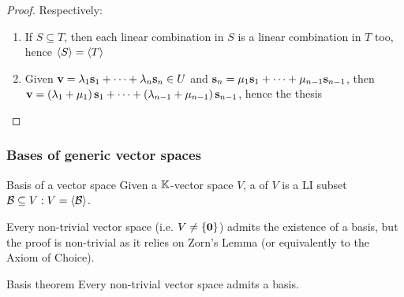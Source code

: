 \begin{proofbox}
  \begin{proof}
    Respectively:
    \begin{enumerate}[label = {\alph*.}]
      \item If $ S \subseteq T $, then each linear combination in $ S $ is a linear combination in $ T $ too, hence $ \braket{S} = \braket{T} $
      \item Given $ \mathbf{v} = \lambda_1 \mathbf{s}_1 + \dots + \lambda_n \mathbf{s}_n \in U $ and $ \mathbf{s}_n = \mu_1 \mathbf{s}_1 + \dots + \mu_{n-1} \mathbf{s}_{n-1} $, then $ \mathbf{v} = \left( \lambda_1 + \mu_1 \right) \mathbf{s}_1 + \dots + \left( \lambda_{n-1} + \mu_{n-1} \right) \mathbf{s}_{n-1} $, hence the thesis
    \end{enumerate}
  \end{proof}
\end{proofbox}

\subsubsection{Bases of generic vector spaces}

\begin{definition}{Basis of a vector space}{}
  Given a $ \mathbb{K} $-vector space $ V $, a  of $ V $ is a LI subset $ \mathcal{B} \subseteq V : V = \braket{\mathcal{B}} $.
\end{definition}

Every non-trivial vector space (i.e. $ V \neq \{\mathbf{0}\} $) admits the existence of a basis, but the proof is non-trivial as it relies on Zorn's Lemma (or equivalently to the Axiom of Choice).

\begin{theorem}{Basis theorem}{}
  Every non-trivial vector space admits a basis.
\end{theorem}

